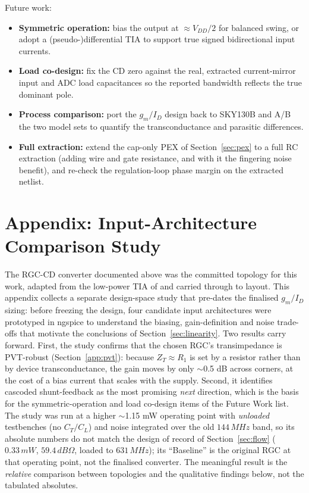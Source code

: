 \documentclass{article}
\begin{document}
Future work:
\begin{itemize}
    \item \textbf{Symmetric operation:} bias the output at $\approx V_{DD}/2$ for balanced swing,
    or adopt a (pseudo-)differential TIA to support true signed bidirectional input currents.
    \item \textbf{Load co-design:} fix the CD zero against the real, extracted current-mirror
    input and ADC load capacitances so the reported bandwidth reflects the true dominant pole.
    \item \textbf{Process comparison:} port the $g_m/I_D$ design back to SKY130B and A/B the two
    model sets to quantify the transconductance and parasitic differences.
    \item \textbf{Full extraction:} extend the cap-only PEX of Section~\ref{sec:pex} to a full RC
    extraction (adding wire and gate resistance, and with it the fingering noise benefit), and
    re-check the regulation-loop phase margin on the extracted netlist.
\end{itemize}

\appendix
\section{Appendix: Input-Architecture Comparison Study}
\label{app:arch}
The RGC-CD converter documented above was the committed topology for this work,
adapted from the low-power TIA of \cite{Low-Power_TIA} and carried through to
layout. This appendix collects a separate design-space study that pre-dates the
finalised $g_m/I_D$ sizing: before freezing the design, four candidate input
architectures were prototyped in ngspice to understand the biasing, gain-definition
and noise trade-offs that motivate the conclusions of Section~\ref{sec:linearity}.
Two results carry forward. First, the study confirms that the chosen RGC's
transimpedance is PVT-robust (Section~\ref{app:pvt}): because $Z_T\approx R_1$ is
set by a resistor rather than by device transconductance, the gain moves by only
$\sim$0.5 dB across corners, at the cost of a bias current that scales with the
supply. Second, it identifies cascoded shunt-feedback as the most promising
\emph{next} direction, which is the basis for the symmetric-operation and load
co-design items of the Future Work list. The study was run at a higher
$\sim$1.15 mW operating point with \emph{unloaded} testbenches (no $C_T/C_L$) and
noise integrated over the old $144\,MHz$ band, so its absolute numbers do not match
the design of record of Section~\ref{sec:flow} ($0.33\,mW$, $59.4\,dB\Omega$, loaded
to $631\,MHz$); its ``Baseline'' is the original RGC at that operating point, not
the finalised converter. The meaningful result is the \emph{relative} comparison
between topologies and the qualitative findings below, not the tabulated absolutes.
\end{document}
